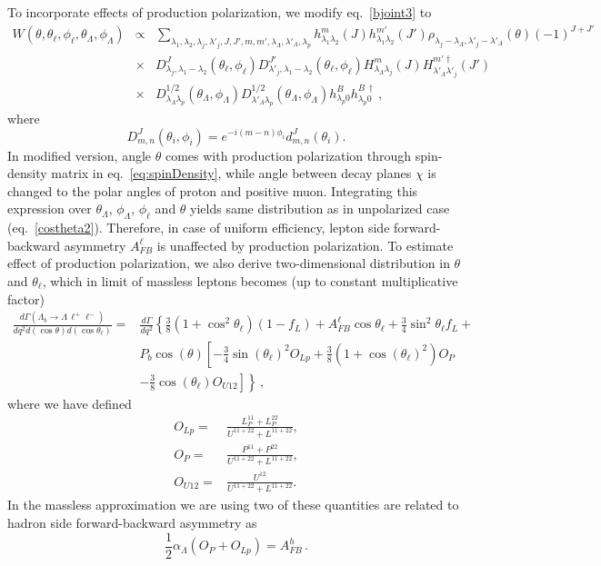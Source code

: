 To incorporate effects of production polarization, we modify eq.~\ref{bjoint3} to  
\begin{eqnarray}
\label{bjoint4}
W(\theta,\theta_\ell,\phi_\ell,\theta_\Lambda,\phi_\Lambda)  &\propto& 
\sum_{\lambda_1,\lambda_{2},\lambda_j,\lambda'_j,J,J',m,m',\lambda_{\Lambda},
\lambda'_{\Lambda},\lambda_{p}} 
h^{m}_{\lambda_1\lambda_2}(J)h^{m'}_{\lambda_1\lambda_2}(J')
\rho_{\lambda_{j}-\lambda_{\Lambda},\lambda'_{j}-\lambda'_{\Lambda}}(\theta)
(-1)^{J+J'}
\nonumber\\ 
&\times&D^J_{\lambda_j,\lambda_1-\lambda_{2}}(\theta_\ell,\phi_\ell)
D^{J'}_{\lambda'_j,\lambda_1-\lambda_{2}}(\theta_\ell,\phi_\ell)
H^{m}_{\lambda_{\Lambda}\lambda_{j}}(J)
H^{m'\dagger}_{\lambda'_{\Lambda}\lambda'_{j}}(J')
\nonumber \\
&\times& 
D^{1/2}_{\lambda_{\Lambda}\lambda_{p}}(\theta_\Lambda,\phi_\Lambda)
D^{1/2}_{\lambda'_{\Lambda}\lambda_{p}}(\theta_\Lambda,\phi_\Lambda)
h^{B}_{\lambda_{p}0}h^{B\,\dagger}_{\lambda_{p}0}\,,
\end{eqnarray}
where
\begin{equation}
D^{J}_{m,n}(\theta_i,\phi_i)=e^{-i(m-n)\phi_i}d^J_{m,n}(\theta_i).
\end{equation}
In modified version, angle $\theta$ comes with production polarization through spin-density matrix
in eq.~\ref{eq:spinDensity}, while angle between decay planes $\chi$ is changed to the polar angles of proton and
positive muon. Integrating this expression over $\theta_\Lambda$, $\phi_\Lambda$, $\phi_\ell$ and $\theta$ yields
same distribution as in unpolarized case (eq.~\ref{costheta2}). Therefore, in case of uniform
efficiency, lepton side forward-backward asymmetry $A_{FB}^\ell$ is unaffected by production
polarization. To estimate effect of production polarization, we also derive two-dimensional
distribution in $\theta$ and $\theta_\ell$, which in limit of massless leptons becomes (up to constant
multiplicative factor)
%
\begin{align}
\frac{d\Gamma(\Lambda_{b}\to \Lambda \,\ell^{+}\ell^{-})}{dq^2d(\cos\theta) d(\cos\theta_\ell)}=&
\frac{d\Gamma}{dq^2}\left\{  \frac{3}{8}\left(1+\cos^2\theta_\ell\right)(1-f_L)+A_{FB}^\ell\cos\theta_\ell +
   \frac{3}{4}\sin^2\theta_\ell f_L+\right. \nonumber \\
&P_b\cos(\theta)\left[ -\frac{3}{4}\sin(\theta_\ell)^2O_{Lp}+
  \frac{3}{8}\left(1+\cos(\theta_\ell)^2\right)O_P\right. \nonumber \\
&\left.\left.-\frac{3}{8}\cos(\theta_\ell)O_{U12} \right]\right\}\,,
\label{eq:lepton2D}
\end{align}
where we have defined
\begin{align}
O_{Lp}=&\frac{L_P^{11}+L_P^{22}}{U^{11+22}+L^{11+22}}, \nonumber \\
O_P=&\frac{P^{11}+P^{22}}{U^{11+22}+L^{11+22}}, \nonumber \\
O_{U12}=&\frac{U^{12}}{U^{11+22}+L^{11+22}}. \nonumber
\end{align}
In the massless approximation we are using two of these quantities are related to hadron side
forward-backward asymmetry as
\begin{equation}
\frac{1}{2}\alpha_\Lambda \left(O_P+O_{Lp}\right)=A_{FB}^h\,.
\end{equation}

